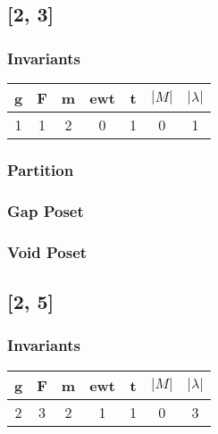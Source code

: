 \documentclass[a4paper]{article}
\begin{document}
\tableofcontents
\newpage
\newpage\subsection{[2, 3]}
\noindent\begin{minipage}{0.6\textwidth}
\subsubsection*{Invariants}
\centering
\begin{tabular}{|c|c|c|c|c|c|c|}
\toprule
g & F & m & ewt & t & \(|M|\) & \(|\lambda|\) \\
\midrule
1 & 1 & 2 & 0 & 1 & 0 & 1 \\
\bottomrule
\end{tabular}
\end{minipage}%
\begin{minipage}{0.4\textwidth}
\subsubsection*{Partition}
\centering
{}
\end{minipage}
\vspace{1cm}
\noindent \newline\begin{minipage}{0.48\textwidth}
\subsubsection*{Gap Poset}
\centering
{}
\end{minipage}%
\hfill\begin{minipage}{0.48\textwidth}
\subsubsection*{Void Poset}
\centering
\end{minipage}
\newpage\subsection{[2, 5]}
\noindent\begin{minipage}{0.6\textwidth}
\subsubsection*{Invariants}
\centering
\begin{tabular}{|c|c|c|c|c|c|c|}
\toprule
g & F & m & ewt & t & \(|M|\) & \(|\lambda|\) \\
\midrule
2 & 3 & 2 & 1 & 1 & 0 & 3 \\
\bottomrule
\end{tabular}
\end{minipage}%
\end{document}
